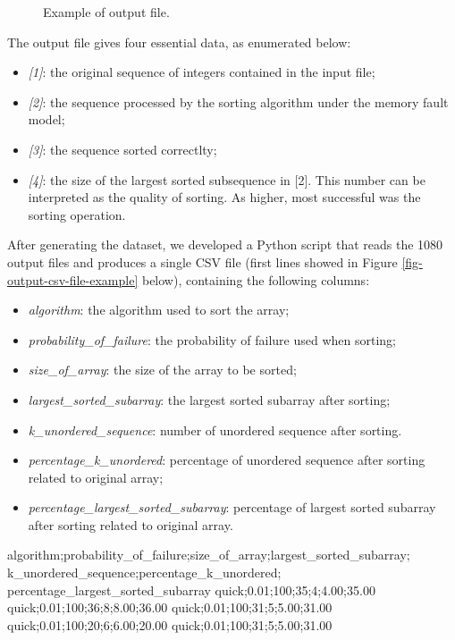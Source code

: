 \begin{figure}[H]
    \centering
    \fbox{
    \theverbbox
    }
    \caption{Example of output file.}
    \label{fig-output-file-example}
\end{figure}

The output file gives four essential data, as enumerated below:
\begin{itemize}
    \item \textit{[1]}: the original sequence of integers contained in the input file;
    \item \textit{[2]}: the sequence processed by the sorting algorithm under the memory fault model;
    \item \textit{[3]}: the sequence sorted correctlty;
    \item \textit{[4]}: the size of the largest sorted subsequence in [2]. This number can be interpreted as the quality of sorting. As higher, most successful was the sorting operation.
\end{itemize}

After generating the dataset, we developed a Python script that reads the 1080 output files and produces a single CSV file (first lines showed in Figure \ref{fig-output-csv-file-example} below), containing the following columns:
\begin{itemize}
    \item \textit{algorithm}: the algorithm used to sort the array;
    \item \textit{probability\_of\_failure}: the probability of failure used when sorting;
    \item \textit{size\_of\_array}: the size of the array to be sorted;
    \item \textit{largest\_sorted\_subarray}: the largest sorted subarray after sorting;
    \item \textit{k\_unordered\_sequence}: number of unordered sequence after sorting.
    \item \textit{percentage\_k\_unordered}: percentage of unordered sequence after sorting related to original array;
    \item \textit{percentage\_largest\_sorted\_subarray}: percentage of largest sorted subarray after sorting related to original array.
\end{itemize}

\begin{verbbox}[\mbox{}]
algorithm;probability_of_failure;size_of_array;largest_sorted_subarray;
k_unordered_sequence;percentage_k_unordered;
percentage_largest_sorted_subarray
quick;0.01;100;35;4;4.00;35.00
quick;0.01;100;36;8;8.00;36.00
quick;0.01;100;31;5;5.00;31.00
quick;0.01;100;20;6;6.00;20.00
quick;0.01;100;31;5;5.00;31.00
\end{verbbox}
        
